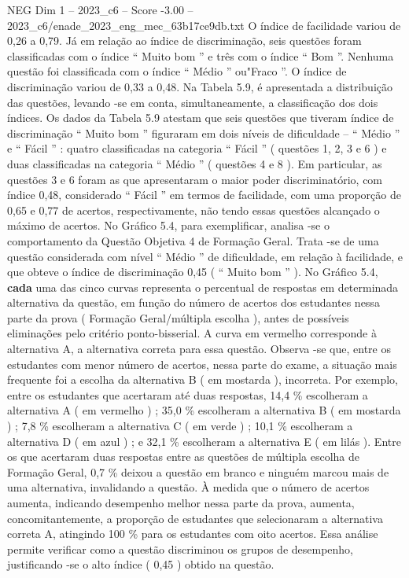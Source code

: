 \begin{textsample}{NEG Dim 1 – 2023\_c6 – Score -3.00 – 2023\_c6/enade\_2023\_eng\_mec\_63b17ce9db.txt}
O índice de facilidade variou de 0,26 a 0,79.
Já em relação ao índice de discriminação, seis questões foram classificadas com o índice “ Muito bom ” e três com o índice “ Bom ”.
Nenhuma questão foi classificada com o índice “ Médio ” ou"Fraco ”.
O índice de discriminação variou de 0,33 a 0,48.
Na Tabela 5.9, é apresentada a distribuição das questões, levando -se em conta, simultaneamente, a classificação dos dois índices.
Os dados da Tabela 5.9 atestam que seis questões que tiveram índice de discriminação “ Muito bom ” figuraram em dois níveis de dificuldade – “ Médio ” e “ Fácil ” : quatro classificadas na categoria “ Fácil ” ( questões 1, 2, 3 e 6 ) e duas classificadas na categoria “ Médio ” ( questões 4 e 8 ).
Em particular, as questões 3 e 6 foram as que apresentaram o maior poder discriminatório, com índice 0,48, considerado “ Fácil ” em termos de facilidade, com uma proporção de 0,65 e 0,77 de acertos, respectivamente, não tendo essas questões alcançado o máximo de acertos.
No Gráfico 5.4, para exemplificar, analisa -se o comportamento da Questão Objetiva 4 de Formação Geral.
Trata -se de uma questão considerada com nível “ Médio ” de dificuldade, em relação à facilidade, e que obteve o índice de discriminação 0,45 ( “ Muito bom ” ).
No Gráfico 5.4, \textbf{cada} uma das cinco curvas representa o percentual de respostas em determinada alternativa da questão, em função do número de acertos dos estudantes nessa parte da prova ( Formação Geral/múltipla escolha ), antes de possíveis eliminações pelo critério ponto-bisserial.
A curva em vermelho corresponde à alternativa A, a alternativa correta para essa questão.
Observa -se que, entre os estudantes com menor número de acertos, nessa parte do exame, a situação mais frequente foi a escolha da alternativa B ( em mostarda ), incorreta.
Por exemplo, entre os estudantes que acertaram até duas respostas, 14,4 \% escolheram a alternativa A ( em vermelho ) ; 35,0 \% escolheram a alternativa B ( em mostarda ) ; 7,8 \% escolheram a alternativa C ( em verde ) ; 10,1 \% escolheram a alternativa D ( em azul ) ; e 32,1 \% escolheram a alternativa E ( em lilás ).
Entre os que acertaram duas respostas entre as questões de múltipla escolha de Formação Geral, 0,7 \% deixou a questão em branco e ninguém marcou mais de uma alternativa, invalidando a questão.
À medida que o número de acertos aumenta, indicando desempenho melhor nessa parte da prova, aumenta, concomitantemente, a proporção de estudantes que selecionaram a alternativa correta A, atingindo 100 \% para os estudantes com oito acertos.
Essa análise permite verificar como a questão discriminou os grupos de desempenho, justificando -se o alto índice ( 0,45 ) obtido na questão.

\end{textsample}
